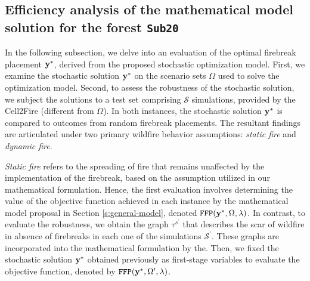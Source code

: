 \documentclass[a4paper,fleqn]{cas-sc}
\begin{document}
\subsection{Efficiency analysis of the mathematical model solution for the forest \texttt{Sub20}} \label{s:results}


In the following subsection, we delve into an evaluation of the optimal  firebreak placement $\vb{y}^{*}$, derived from the proposed stochastic optimization model. First, we examine the stochastic solution $\vb{y}^{*}$ on the scenario sets $\Omega$ used to solve the optimization model. Second, to assess the robustness of the stochastic solution, we subject the solutions to a test set comprising $\mathcal{S}$ simulations, provided by the Cell2Fire (different from $\Omega$). In both instances, the stochastic solution $\vb{y}^{*}$ is compared to outcomes from random firebreak placements. The resultant findings are articulated under two primary wildfire behavior assumptions: \textit{static fire} and \textit{dynamic fire}.

\textit{Static fire} refers to the spreading of fire that remains unaffected by the implementation of the firebreak, based on the assumption utilized in our mathematical formulation. Hence, the first evaluation involves determining the value of the objective function achieved in each instance by the mathematical model proposal in Section \ref{s:general-model}, denoted $\texttt{FFP}(\vb{y}^*,\Omega,\lambda)$. In contrast, to evaluate the robustness, we obtain the graph $\tau^{s^\prime}$ that describes the scar of wildfire in absence of firebreaks in each one of the simulations $\mathcal{S}^\prime$. These graphs are incorporated into the mathematical formulation by the. Then, we fixed the stochastic solution $\vb{y}^*$ obtained previously as first-stage variables to evaluate the objective function, denoted by $\texttt{FFP}(\vb{y}^*,\Omega^\prime,\lambda)$.
\end{document}
